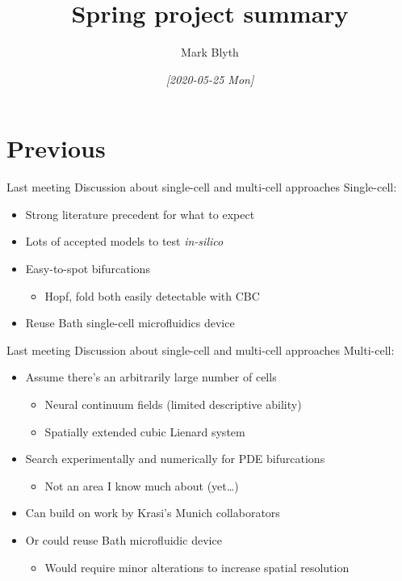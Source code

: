 \documentclass[presentation]{beamer}
\author{Mark Blyth}
\date{\textit{[2020-05-25 Mon]}}
\title{Spring project summary}
\begin{document}
\maketitle

\section{Previous}
\label{sec:org2c57db8}
\begin{frame}[label={sec:org195a749}]{Last meeting}
Discussion about single-cell and multi-cell approaches
\vfill
Single-cell: 
\begin{itemize}[<+->]
\item Strong literature precedent for what to expect
\item Lots of accepted models to test \emph{in-silico}
\item Easy-to-spot bifurcations
\begin{itemize}
\item Hopf, fold both easily detectable with CBC
\end{itemize}
\item Reuse Bath single-cell microfluidics device
\end{itemize}
\end{frame}


\begin{frame}[label={sec:orgd2e8c53}]{Last meeting}
Discussion about single-cell and multi-cell approaches
\vfill
Multi-cell: 
\begin{itemize}[<+->]
\item Assume there's an arbitrarily large number of cells
\begin{itemize}
\item Neural continuum fields (limited descriptive ability)
\item Spatially extended cubic Lienard system
\end{itemize}
\item Search experimentally and numerically for PDE bifurcations
\begin{itemize}
\item Not an area I know much about (yet\ldots{})
\end{itemize}
\item Can build on work by Krasi's Munich collaborators
\item Or could reuse Bath microfluidic device
\begin{itemize}
\item Would require minor alterations to increase spatial resolution
\end{itemize}
\end{itemize}
\end{frame}
\end{document}
